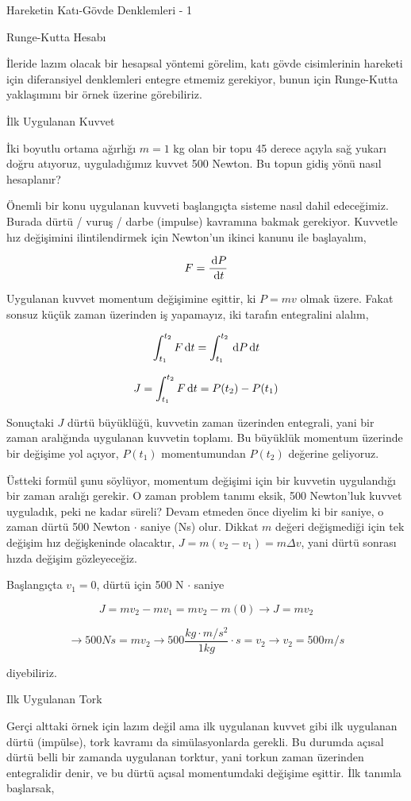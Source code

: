 \documentclass[12pt,fleqn]{article}\usepackage{../../common}
\begin{document}
Hareketin Katı-Gövde Denklemleri - 1

Runge-Kutta Hesabı

İleride lazım olacak bir hesapsal yöntemi görelim, katı gövde cisimlerinin
hareketi için diferansiyel denklemleri entegre etmemiz gerekiyor, bunun
için Runge-Kutta yaklaşımını bir örnek üzerine görebiliriz.

İlk Uygulanan Kuvvet

İki boyutlu ortama ağırlığı $m=1$ kg olan bir topu 45 derece açıyla sağ yukarı
doğru atıyoruz, uyguladığımız kuvvet 500 Newton. Bu topun gidiş yönü nasıl
hesaplanır?

Önemli bir konu uygulanan kuvveti başlangıçta sisteme nasıl dahil edeceğimiz.
Burada dürtü / vuruş / darbe (impulse) kavramına bakmak gerekiyor. Kuvvetle hız
değişimini ilintilendirmek için Newton'un ikinci kanunu ile başlayalım,

$$
F = \frac{\,\mathrm{d} P}{\,\mathrm{d} t} 
$$

Uygulanan kuvvet momentum değişimine eşittir, ki $P = mv$ olmak üzere. Fakat
sonsuz küçük zaman üzerinden iş yapamayız, iki tarafın entegralini alalım,

$$
\int_{t_1}^{t_2} F \,\mathrm{d} t = \int_{t_1}^{t_2} \,\mathrm{d} P \,\mathrm{d} t
$$

$$
J = \int_{t_1}^{t_2} F \,\mathrm{d} t = P(t_2) - P(t_1)
$$

Sonuçtaki $J$ dürtü büyüklüğü, kuvvetin zaman üzerinden entegrali, yani
bir zaman aralığında uygulanan kuvvetin toplamı. Bu büyüklük momentum
üzerinde bir değişime yol açıyor, $P(t_1)$ momentumundan $P(t_2)$
değerine geliyoruz.

Üstteki formül şunu söylüyor, momentum değişimi için bir kuvvetin uygulandığı
bir zaman aralığı gerekir. O zaman problem tanımı eksik, 500 Newton'luk kuvvet
uyguladık, peki ne kadar süreli? Devam etmeden önce diyelim ki bir saniye, o
zaman dürtü 500 Newton $\cdot$ saniye (Ns) olur. Dikkat $m$ değeri değişmediği
için tek değişim hız değişkeninde olacaktır, $J = m(v_2 - v_1) = m \Delta v$,
yani dürtü sonrası hızda değişim gözleyeceğiz.

Başlangıçta $v_1=0$, dürtü için 500 N $\cdot$ saniye

$$
J = m v_2 - m v_1 = m v_2 - m(0) \to J = m v_2
$$

$$
\to 500 Ns = m v_2
\to 500 \frac{kg \cdot m/s^2}{1 kg } \cdot s = v_2
\to v_2 = 500 m/s
$$

diyebiliriz.

Ilk Uygulanan Tork

Gerçi alttaki örnek için lazım değil ama ilk uygulanan kuvvet gibi ilk uygulanan
dürtü (impülse), tork kavramı da simülasyonlarda gerekli. Bu durumda açısal
dürtü belli bir zamanda uygulanan torktur, yani torkun zaman üzerinden
entegralidir denir, ve bu dürtü açısal momentumdaki değişime eşittir. İlk
tanımla başlarsak,
\end{document}
